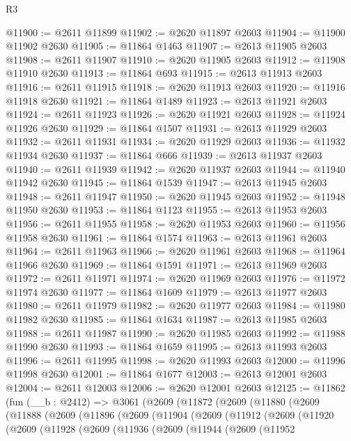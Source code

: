 \begin{lexlean}{R3}
\begin{coremodule}
@11900 := @2611 @11899
@11902 := @2620 @11897 @2603
@11904 := @11900 @11902 @2630
@11905 := @11864 @1463
@11907 := @2613 @11905 @2603
@11908 := @2611 @11907
@11910 := @2620 @11905 @2603
@11912 := @11908 @11910 @2630
@11913 := @11864 @693
@11915 := @2613 @11913 @2603
@11916 := @2611 @11915
@11918 := @2620 @11913 @2603
@11920 := @11916 @11918 @2630
@11921 := @11864 @1489
@11923 := @2613 @11921 @2603
@11924 := @2611 @11923
@11926 := @2620 @11921 @2603
@11928 := @11924 @11926 @2630
@11929 := @11864 @1507
@11931 := @2613 @11929 @2603
@11932 := @2611 @11931
@11934 := @2620 @11929 @2603
@11936 := @11932 @11934 @2630
@11937 := @11864 @666
@11939 := @2613 @11937 @2603
@11940 := @2611 @11939
@11942 := @2620 @11937 @2603
@11944 := @11940 @11942 @2630
@11945 := @11864 @1539
@11947 := @2613 @11945 @2603
@11948 := @2611 @11947
@11950 := @2620 @11945 @2603
@11952 := @11948 @11950 @2630
@11953 := @11864 @1123
@11955 := @2613 @11953 @2603
@11956 := @2611 @11955
@11958 := @2620 @11953 @2603
@11960 := @11956 @11958 @2630
@11961 := @11864 @1574
@11963 := @2613 @11961 @2603
@11964 := @2611 @11963
@11966 := @2620 @11961 @2603
@11968 := @11964 @11966 @2630
@11969 := @11864 @1591
@11971 := @2613 @11969 @2603
@11972 := @2611 @11971
@11974 := @2620 @11969 @2603
@11976 := @11972 @11974 @2630
@11977 := @11864 @1609
@11979 := @2613 @11977 @2603
@11980 := @2611 @11979
@11982 := @2620 @11977 @2603
@11984 := @11980 @11982 @2630
@11985 := @11864 @1634
@11987 := @2613 @11985 @2603
@11988 := @2611 @11987
@11990 := @2620 @11985 @2603
@11992 := @11988 @11990 @2630
@11993 := @11864 @1659
@11995 := @2613 @11993 @2603
@11996 := @2611 @11995
@11998 := @2620 @11993 @2603
@12000 := @11996 @11998 @2630
@12001 := @11864 @1677
@12003 := @2613 @12001 @2603
@12004 := @2611 @12003
@12006 := @2620 @12001 @2603
@12125 := @11862
    (fun (__b : @2412) =>
    @3061
      (@2609
        (@11872
          (@2609
            (@11880
              (@2609
                (@11888
                  (@2609
                    (@11896
                      (@2609
                        (@11904
                          (@2609
                            (@11912
                              (@2609
                                (@11920
                                  (@2609
                                    (@11928
                                      (@2609
                                        (@11936
                                          (@2609
                                            (@11944
                                              (@2609
                                                (@11952

\end{coremodule}
\end{lexlean}

